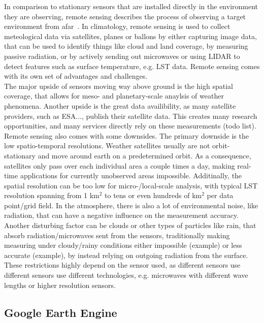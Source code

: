 In comparison to stationary sensors that are installed directly in the environment they are observing, remote sensing describes the process of observing a target environment from afar~\cite{campbell2011introduction}. In climatology, remote sensing is used to collect meteological data via satellites, planes or ballons by either capturing image data, that can be used to identify things like cloud and land coverage, by measuring passive radiation, or by actively sending out microwaves or using LIDAR to detect features such as surface temperature, e.g. LST data. Remote sensing comes with its own set of advantages and challenges.\\
The major upside of sensors moving way above ground is the high spatial coverage, that allows for meso- and planetary-scale anaylsis of weather phenomena. Another upside is the great data availibility, as many satellite providers, such as ESA..., publish their satellite data. This creates many research opportunities, and many services directly rely on these measurements (todo list).\\ %
Remote sensing also comes with some downsides. The primary downside is the low spatio-temporal resolutions. Weather satellites usually are not orbit-stationary and move around earth on a predetermined orbit. As a consequence, satellites only pass over each individual area a couple times a day, making real-time applications for currently unobserved areas impossible. Additinally, the spatial resolution can be too low for micro-/local-scale analysis, with typical LST resolution spanning from 1 km$^{2}$ to tens or even hundreds of km$^{2}$ per data point/grid field. In the atmosphere, there is also a lot of environmental noise, like radiation, that can have a negative influence on the measurement accuracy. Another disturbing factor can be clouds or other types of particles like rain, that absorb radiation/microwaves sent from the sensors, traditionally making measuring under cloudy/rainy conditions either impossible (example) or less accurate (example), by instead relying on outgoing radiation from the surface. These restrictions highly depend on the sensor used, as different sensors use different 
sensors use different technologies, e.g. microwaves with different wave lengths or higher resolution sensors.

\subsection{Google Earth Engine}

